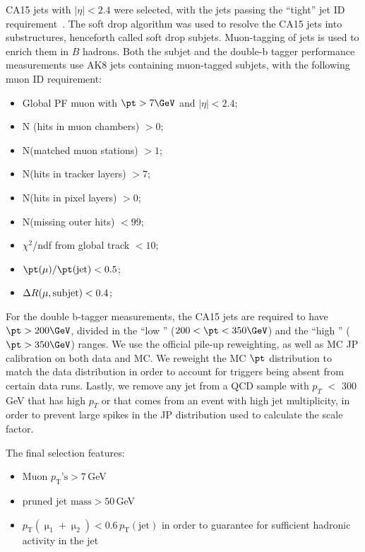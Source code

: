 CA15 jets with $|\eta| < 2.4$ were selected, with the jets passing the ``tight'' jet ID requirement~\cite{JetID13TeVTWiki}. The soft drop algorithm was used to resolve the CA15 jets into substructures, henceforth called soft drop subjets. Muon-tagging of jets is used to enrich them in $B$ hadrons. Both the subjet and the double-b tagger performance measurements use AK8 jets containing muon-tagged subjets, with the following muon ID requirement:

\begin{itemize}
\item Global PF muon with $\pt > 7\GeV$ and $|\eta| < 2.4$;
\item N (hits in muon chambers) $> 0$;
\item N(matched muon stations) $> 1$;
\item N(hits in tracker layers) $> 7$;
\item N(hits in pixel layers) $> 0$;
\item N(missing outer hits) $< 99$;
\item $\chi^{2}$/ndf from global track $< 10$;
\item $\pt(\mu)/\pt({\rm jet})  < 0.5$;
\item $\Delta R(\mu, {\rm subjet}) < 0.4$;
\end{itemize}

For the double b-tagger measurements, the CA15 jets are required to have $\pt > 200\GeV$, divided in the ``low \pt'' ($200 < \pt < 350\GeV$) and the ``high \pt'' ($\pt > 350\GeV$) ranges. We use the official pile-up reweighting, as well as MC JP calibration on both data and MC.
We reweight the MC $\pt$ distribution to match the data distribution in order to account for triggers being absent from certain data runs. Lastly, we remove any jet from a QCD sample with $p_{T}$ $<$ 300 GeV that has high $p_{T}$ or that comes from an event with high jet multiplicity, in order to prevent large spikes in the JP distribution used to calculate the scale factor.

The final selection features:

\begin{itemize}
\item Muon $p_\text{T}\text{'s}>7$\,GeV
\item $\text{pruned~jet~mass}>50$\,GeV
\item $p_\text{T}(\upmu_1+\upmu_2)<0.6\,p_\text{T}(\text{jet})$ in order to guarantee for sufficient hadronic activity in the jet 
\end{itemize}


